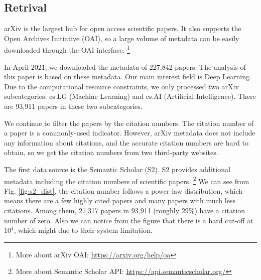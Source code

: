 \subsection{Retrival}

arXiv is the largest hub for open access scientific papers.
It also supports the Open Archives Initiative (OAI),
so a large volume of metadata can be easily downloaded through the OAI interface.
\footnote{More about arXiv OAI: \url{https://arxiv.org/help/oa}}

In April 2021, we downloaded the metadata of 227,842 papers.
The analysis of this paper is based on these metadata.
Our main interest field is Deep Learning.
Due to the computational resource constraints, we only processed two arXiv subcategories: cs.LG (Machine Learning) and cs.AI (Artificial Intelligence).
There are 93,911 papers in these two subcategories.

We continue to filter the papers by the citation numbers.
The citation number of a paper is a commonly-used indicator.
However, arXiv metadata does not include any information about citations,
and the accurate citation numbers are hard to obtain,
so we get the citation numbers from two third-party websites.

The first data source is the Semantic Scholar (S2).
S2 provides additional metadata including the citation numbers of scientific papers.
\footnote{More about Semantic Scholar API: \url{https://api.semanticscholar.org/}}
We can see from Fig. \ref{fig:s2_dist}, the citation number follows a power-law distribution, which means there are a few highly cited papers and many papers with much less citations.
Among them, 27,317 papers in 93,911 (roughly 29\%) have a citation number of zero.
Also we can notice from the figure that there is a hard cut-off at $10^4$, which might due to their system limitation.

